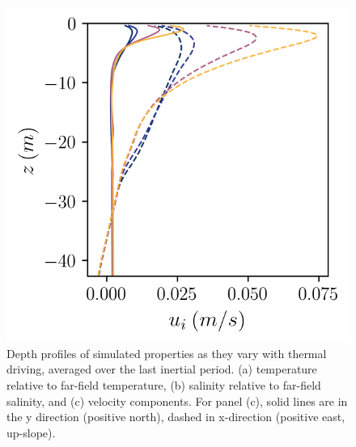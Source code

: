 \documentclass[draft]{agujournal2019}
\begin{document}
\begin{figure}[h!]
\begin{minipage}{0.33\textwidth}
    \end{minipage}%
    \begin{minipage}{0.33\textwidth}
        \includegraphics[trim={0 0 0 0},clip, width=\textwidth]{Figures/velocity_cmp_dT_43h_tav13h_z_profile.png}
    \end{minipage}
    \caption{Depth profiles of simulated properties as they vary with thermal driving, averaged over the last inertial period. (a) temperature relative to far-field temperature, (b) salinity relative to far-field salinity, and (c) velocity components. For panel (c), solid lines are in the y direction (positive north), dashed in x-direction (positive east, up-slope).}
    \label{fig:dT_profiles}
\end{figure}
\end{document}
